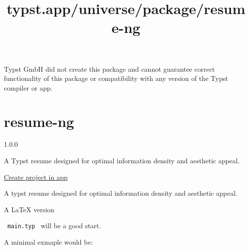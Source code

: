 Typst GmbH did not create this package and cannot guarantee correct
functionality of this package or compatibility with any version of the
Typst compiler or app.


\title{typst.app/universe/package/resume-ng}

\label{banner}
\label{template-thumbnail}

\section{resume-ng}\label{resume-ng}

{ 1.0.0 }

A Typst resume designed for optimal information density and aesthetic
appeal.

\href{/app?template=resume-ng&version=1.0.0}{Create project in app}

\label{readme}
A typst resume designed for optimal information density and aesthetic
appeal.

A LaTeX version

\texttt{\ main.typ\ } will be a good start.

A minimal exmaple would be:

